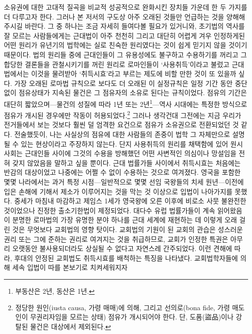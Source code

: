 소유권에 대한 고대적 질곡을 비교적 성공적으로 완화시킨 장치들 가운데
한 두 가지를 더 다루고자 한다.
그러나 본 저서의 구도상 아주 오래된 것들만 언급하는 것을
양해해 주시길 바란다.
그 중 하나는 조금 자세히 들여다볼 필요가 있거니와,
초기법의 역사를 잘 모르는 사람들에게는
근대법이 아주 천천히 그리고 대단히 어렵게 겨우 인정하게된
어떤 원리가 유년기의 법학에는 실로 친숙한 원리였다는 것이
쉽게 믿기지 않을 것이기 때문이다.
법의 원리들 중에
근대인들이 그 유용성에도 불구하고
수용하기를 꺼리고 그 합당한 결론들을 관철시키기를 꺼린
원리로
로마인들이 `\hypertarget{usucapio}{사용취득}'이라고
불렀고
근대법에서는
이것을 물려받아
`취득시효'라고 부르는 제도에
비할 만한 것이 또 있을까 싶다.
가장 오래된 로마법 규칙으로
보다도 더 오래된
이 실정규칙은
일정 기간 동안 중단 없이 점유상태가 지속된 물건은
그 점유자의 소유로 된다는 규칙이었다.
점유의 기간은 대단히 짧았으며---물건의 성질에 따라
1년 또는 2년\footnote{%
  부동산은 2년, 동산은 1년.
}---역사
시대에는 특정한 방식으로 점유가 개시된 경우에만 작동이 허용되었다.\footnote{%
  정당한 원인(iusta causa, 가령 매매)에 의해, 그리고
  선의로(bona fide, 가령 매도인이 무권리자임을 모르는 상태)
  점유가 개시되어야 한다.
  단, 도품(盜品)이나 강탈된 물건은 대상에서 제외된다. }
그러나 생각건대 그전에는
지금 우리가 전거들에서 보는 것보다 훨씬 덜 엄격한 요건으로
점유가 소유권으로 전환되었던 것 같다.
전술했듯이,
나는 사실상의 점유에 대한 사람들의 존중이
법학 그 자체만으로 설명될 수 있는 현상이라고 주장하지 않는다.
단지 사용취득의 원리를 채택함에 있어 원시사회는
근대인들 사이에 그것의 수용을 방해했던
어떤 사변적인 의심이나 망설임을 전혀 갖지 않았음을 말하고 싶을 뿐이다.
근대 법률가들 사이에서 취득시효는
처음에는 반감의 대상이었고
나중에는 어쩔 수 없이 수용하는 것으로 여겨졌다.
영국을 포함한 몇몇 나라에서는
과거 특정 시점---일반적으로 몇몇 선임 국왕들의 치세 원년---이전에 입은
손해에 기해서 제소가
이루어지는 것을 막는 것 이상으로
입법이 나아가지를 못했다.
중세가 마침내 마감하고
제임스 1세가 영국왕에 오른 이후에
비로소
사뭇 불완전한 것이었으나 진정한
출소기한법이
제정되었다.
대다수 유럽 법률가들이 계속 읽어왔음이 분명한
로마법의 가장 유명한 분야 하나를 근대 세계에 재현하는 데
이렇게 오래 걸린 것은
무엇보다 교회법의 영향 탓이다.
교회법의 기원이 된 교회의 관습은
성스러운 권리 또는 그에 준하는 권리로 여겨지는 것을 취급하므로,
교회가 인정한 특권은
아무리 오랫동안 불사용되더라도
상실될 수 없다고
자연스레
간주되었다.
이런 견해에 따라,
후대의 안정된 교회법도 취득시효를 배척하는 특징을 나타냈다.
교회법학자들에 의해 세속 입법이 따를 본보기로 치켜세워지자
